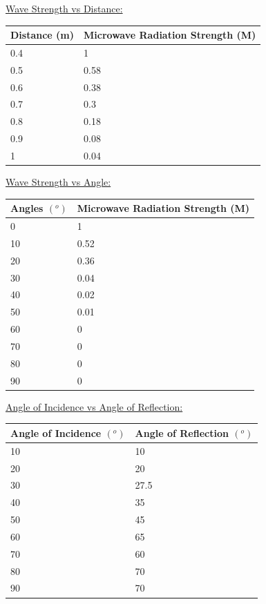 \documentclass[11pt, titlepage]{article}
\begin{document}
\underline{Wave Strength vs Distance:}
\begin{center}
\begin{tabular}
{|m{9em}|m{18em}|}
\hline
Distance (m) & Microwave Radiation Strength (M) \\
\hline
0.4 & 1\\
\hline
0.5 & 0.58\\
\hline
0.6 & 0.38\\
\hline
0.7 & 0.3\\
\hline
0.8 & 0.18\\
\hline
0.9 & 0.08\\
\hline
1 & 0.04\\
\hline
\end{tabular}
\end{center}

\underline{Wave Strength vs Angle:}
\begin{center}
\begin{tabular}
{|m{9em}|m{18em}|}
\hline
Angles $(^o)$ & Microwave Radiation Strength (M) \\
\hline
0 & 1\\
\hline
10 & 0.52\\
\hline
20 & 0.36\\
\hline
30 & 0.04\\
\hline
40 & 0.02\\
\hline
50 & 0.01\\
\hline
60 & 0\\
\hline
70 & 0\\
\hline
80 & 0\\
\hline
90 & 0\\
\hline
\end{tabular}
\end{center}

\underline{Angle of Incidence vs Angle of Reflection:}
\begin{center}
\begin{tabular}
{|m{12em}|m{12em}|}
\hline
Angle of Incidence $(^o)$ & Angle of Reflection $(^o)$ \\
\hline
10 & 10\\
\hline
20 & 20\\
\hline
30 & 27.5\\
\hline
40 & 35\\
\hline
50 & 45\\
\hline
60 & 65\\
\hline
70 & 60\\
\hline
80 & 70\\
\hline
90 & 70\\
\hline
\end{tabular}
\end{center}
\end{document}
